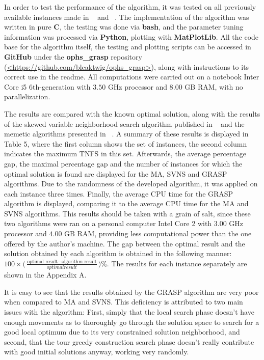 In order to test the performance of the algorithm, it was tested on all previously available instances made in ~\cite{divsalar2013} and ~\cite{divsalar2014}. The implementation of the algorithm was written in pure \textbf{C}, the testing was done via \textbf{bash}, and the parameter tuning information was processed via \textbf{Python}, plotting with \textbf{MatPlotLib}. All the code base for the algorithm itself, the testing and plotting scripts can be accessed in \textbf{GitHub} under the \textbf{ophs\_grasp} repository (\url{<https://github.com/bleaktwig/ophs\_grasp>}), along with instructions to its correct use in the readme. All computations were carried out on a notebook Inter Core i5 6th-generation with $3.50$ GHz processor and $8.00$ GB RAM, with no parallelization.

The results are compared with the known optimal solution, along with the results of the skewed variable neighborhood search algorithm published in ~\cite{divsalar2013} and the memetic algorithms presented in ~\cite{divsalar2014}. A summary of these results is displayed in Table 5, where the first column shows the set of instances, the second column indicates the maximum TNFS in this set. Afterwards, the average percentage gap, the maximal percentage gap and the number of instances for which the optimal solution is found are displayed for the MA, SVNS and GRASP algorithms. Due to the randomness of the developed algorithm, it was applied on each instance three times. Finally, the average CPU time for the GRASP algorithm is displayed, comparing it to the average CPU time for the MA and SVNS algorithms. This results should be taken with a grain of salt, since these two algorithms were ran on a personal computer Intel Core 2 with $3.00$ GHz processor and $4.00$ GB RAM, providing less computational power than the one offered by the author's machine. The gap between the optimal result and the solution obtained by each algorithm is obtained in the following manner:
$100 \times \Big(\frac{\text{optimal result} - \text{algorithm result}}{optimal result}\Big)\%$. The results for each instance separately are shown in the Appendix A.

It is easy to see that the results obtained by the GRASP algorithm are very poor when compared to MA and SVNS. This deficiency is attributed to two main issues with the algorithm: First, simply that the local search phase doesn't have enough movements as to thoroughly go through the solution space to search for a good local optimum due to its very constrained solution neighborhood, and second, that the tour greedy construction search phase doesn't really contribute with good initial solutions anyway, working very randomly.

